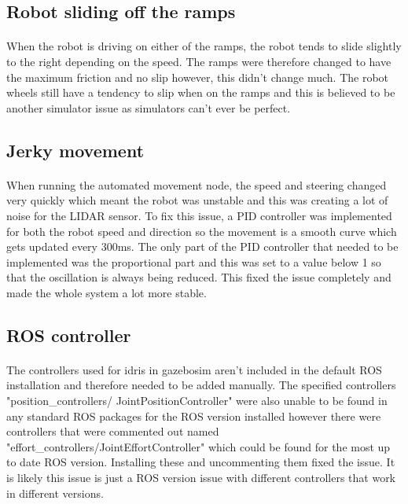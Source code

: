 \subsection{Robot sliding off the ramps}
\paragraph{}
When the robot is driving on either of the ramps, the robot tends to slide slightly to the right depending on the speed. The ramps were therefore changed to have the maximum friction and no slip however, this didn't change much. The robot wheels still have a tendency to slip when on the ramps and this is believed to be another simulator issue as simulators can't ever be perfect.

\subsection{Jerky movement}
\paragraph{}
When running the automated movement node, the speed and steering changed very quickly which meant the robot was unstable and this was creating a lot of noise for the LIDAR sensor. To fix this issue, a PID controller was implemented for both the robot speed and direction so the movement is a smooth curve which gets updated every 300ms. The only part of the PID controller that needed to be implemented was the proportional part and this was set to a value below 1 so that the oscillation is always being reduced. This fixed the issue completely and made the whole system a lot more stable.

\subsection{ROS controller}
\paragraph{}
The controllers used for idris in gazebosim aren't included in the default ROS installation and therefore needed to be added manually. The specified controllers "position\_controllers/ JointPositionController" were also unable to be found in any standard ROS packages for the ROS version installed however there were controllers that were commented out named "effort\_controllers/JointEffortController" which could be found for the most up to date ROS version. Installing these and uncommenting them fixed the issue. It is likely this issue is just a ROS version issue with different controllers that work in different versions.

